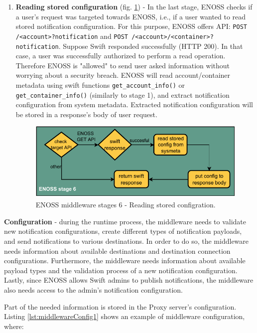 \begin{enumerate}
        \item \textbf{Reading stored configuration} (fig. \ref{fig:enoss-stage6}) - In the last stage, ENOSS checks if a user's request was targeted towards ENOSS, i.e., if a user wanted to read stored notification configuration. For this purpose, ENOSS offers API: \texttt{POST /<account>?notification} and \texttt{POST /<account>/<container>?notification}. Suppose Swift responded successfully (HTTP 200). In that case, a user was successfully authorized to perform a read operation. Therefore ENOSS is "allowed" to send user asked information without worrying about a security breach. ENOSS will read account/container metadata using swift functions \texttt{get\_account\_info()} or \texttt{get\_container\_info()} (similarly to stage 1), and extract notification configuration from system metadata. Extracted notification configuration will be stored in a response's body of user request.

        \begin{figure}[H]
            \centering
            \includegraphics[width=1\textwidth]{obrazky-figures/enoss-stage6.pdf}
            \caption{ENOSS middleware stages 6 - Reading stored configration.}
            \label{fig:enoss-stage6}
        \end{figure}
    \end{enumerate}

    \textbf{Configuration} - during the runtime process, the middleware needs to validate new notification configurations, create different types of notification payloads, and send notifications to various destinations. In order to do so, the middleware needs information about available destinations and destination connection configurations. Furthermore, the middleware needs information about available payload types and the validation process of a new notification configuration. Lastly, since ENOSS allows Swift admins to publish notifications, the middleware also needs access to the admin's notification configuration.

    Part of the needed information is stored in the Proxy server's configuration. Listing \ref{lst:middlewareConfig1} shows an example of middleware configuration, where:

